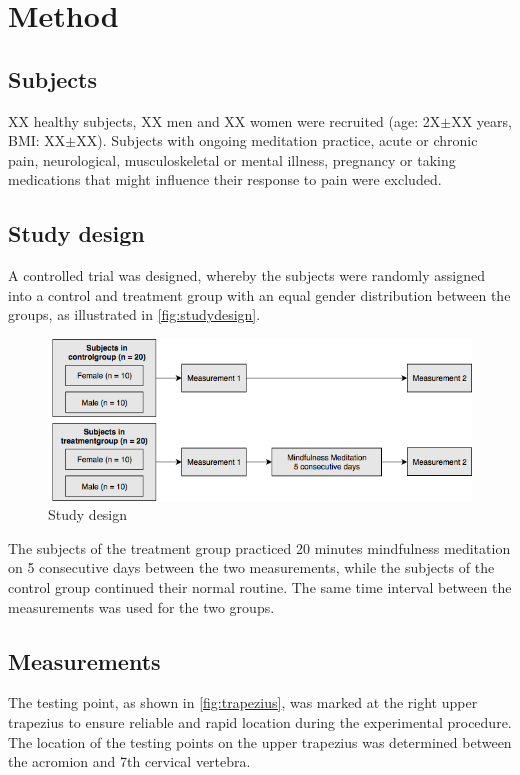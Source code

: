 \section{Method}
\subsection{Subjects}
XX healthy subjects, XX men and XX women were recruited (age: 2X$\pm$XX years, BMI: XX$\pm$XX). Subjects with ongoing meditation practice, acute or chronic pain, neurological, musculoskeletal or mental illness, pregnancy or taking medications that might influence their response to pain were excluded.

\subsection{Study design}
A controlled trial was designed, whereby the subjects were randomly assigned into a control and treatment group with an equal gender distribution between the groups, as illustrated in \autoref{fig:studydesign}.

\begin{figure}[H]
\centering
\includegraphics[width=1\columnwidth]{../figures/studydesign.png}
\caption{Study design}
\label{fig:studydesign}
\end{figure} \vspace{-.5cm}

The subjects of the treatment group practiced 20 minutes mindfulness meditation on 5 consecutive days between the two measurements, while the subjects of the control group continued their normal routine. The same time interval between the measurements was used for the two groups.

\subsection{Measurements}%
The testing point, as shown in \autoref{fig:trapezius}, was marked at the right upper trapezius to ensure reliable and rapid location during the experimental procedure. The location of the testing points on the upper trapezius was determined between the acromion and 7th cervical vertebra. 

